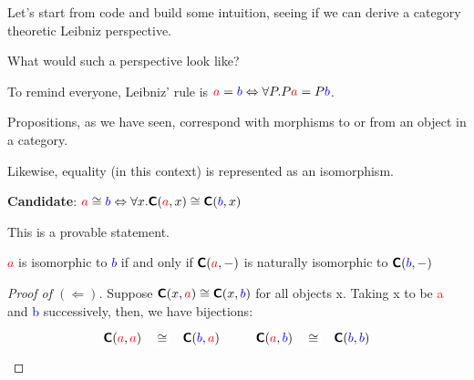 \documentclass[tikz]{beamer}
\newcommand{\cat}[1]{\bm{ \mathsf{#1} }}
\newcommand{\cc}{\cat{C}}
\newcommand{\red}[1]{\textcolor{red}{#1}}
\newcommand{\mred}[1]{\textcolor{red}{$#1$}}
\newcommand{\blue}[1]{\textcolor{blue}{#1}}
\newcommand{\mblue}[1]{\textcolor{blue}{$#1$}}
\theoremstyle{definition}
\begin{document}
\frame
{
	Let's start from code and build some intuition, seeing if we can derive a category theoretic Leibniz perspective. 
}

\frame
{
	What would such a perspective look like? 
}

\frame
{
	To remind everyone, Leibniz' rule is $ \red{a} = \blue{b} \Leftrightarrow \forall P. P \red{a} = P \blue{b}$. 
}

\frame
{
	Propositions, as we have seen, correspond with morphisms to or from an object in a category. 
	
	Likewise, equality (in this context) is represented as an isomorphism. 
}

\frame
{
	\textbf{Candidate}: $\red{a} \cong \blue{b} \Leftrightarrow \forall x. \cc(\red{a}, x) \cong \cc(\blue{b}, x)$
}


\frame
{
	This is a provable statement. 
}

\frame
{
	\begin{definition}
		\mred{a} is isomorphic to \mblue{b} if and only if $\cc(\red{a}, -)$ is naturally isomorphic to  $\cc(\blue{b}, -)$
	\end{definition}
	
}

\begin{frame}[fragile]

	\begin{proof}[Proof of $(\Leftarrow)$]
		Suppose $\cc(x, \red{a}) \cong \cc(x, \blue{b})$ for all objects x. Taking x to be \red{a} and \blue{b} successively, then, we have bijections: 
		\[
		\begin{aligned}
			\begin{tikzcd}[
  ar symbol/.style = {draw=none,"\textstyle#1" description,sloped},
  isomorphic/.style = {ar symbol={\cong}},
  ]
				\cc(\red{a}, \red{a}) \ar[r, isomorphic] & \cc(\blue{b}, \red{a}) 
			\end{tikzcd}
			\qquad
			\begin{tikzcd}[
  ar symbol/.style = {draw=none,"\textstyle#1" description,sloped},
  isomorphic/.style = {ar symbol={\cong}},
  ]
				\cc(\red{a}, \blue{b}) \ar[r, isomorphic] & \cc(\blue{b}, \blue{b})
			\end{tikzcd}
		\end{aligned}
		\]
		
	\end{proof}
\end{frame}
\end{document}
